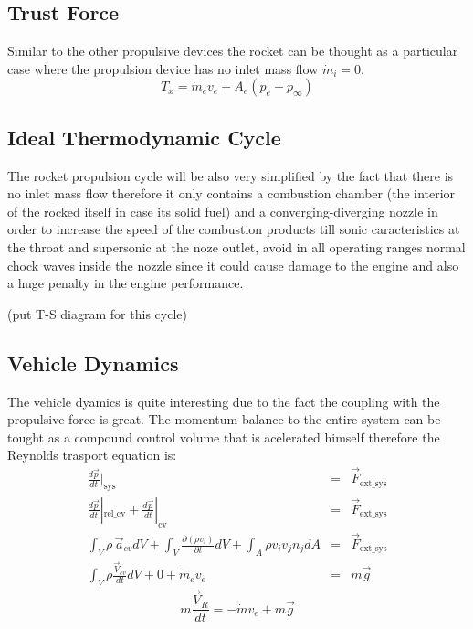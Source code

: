     \subsection{Trust Force}
    Similar to the other propulsive devices the rocket can be thought as a particular case where the propulsion device has no inlet mass flow $\dot{m}_i = 0$.
    \begin{equation}
        \label{rocket_thrust}
        T_x = \dot{m}_e v_e + A_e (p_e - p_\infty)
    \end{equation}
    \subsection{Ideal Thermodynamic Cycle}
    The rocket propulsion cycle will be also very simplified by the fact that there is no inlet mass flow therefore it only contains a combustion chamber (the interior of the rocked itself in case its solid fuel) and a converging-diverging nozzle in order to increase the speed of the combustion products till sonic caracteristics at the throat and supersonic at the noze outlet, avoid in all operating ranges normal chock waves inside the nozzle since it could cause damage to the engine and also a huge penalty in the engine performance. 

    (put T-S diagram for this cycle)         
    

    \subsection{Vehicle Dynamics}
    The vehicle dyamics is quite interesting due to the fact the coupling with the propulsive force is great.
    The momentum balance to the entire system can be tought as a compound control volume that is acelerated himself therefore the Reynolds trasport equation is:  
    \begin{align}
        \frac{d \vec{p}}{dt}|_{\text{sys}} &=& \vec{F}_{\text{ext\_sys}}\\ 
        \frac{d \vec{p}}{dt}|_{\text{rel\_cv}} + \frac{d \vec{p}}{dt}|_{\text{cv}} &=& \vec{F}_{\text{ext\_sys}}\\ 
        \int_V \rho \, \vec{a}_{cv} dV + \int_V \frac{\partial (\rho v_i)}{\partial t} dV + \int_A \rho v_i v_j n_j dA&=& \vec{F}_{\text{ext\_sys}} \\
        \int_V \rho \frac{\vec{V}_{cv}}{dt} dV + 0 + \dot{m}_e v_e &=& m\vec{g}
    \end{align} 
    \begin{equation}
        m\frac{\vec{V}_R}{dt} = -\dot{m} v_e  + m\vec{g}
    \end{equation}


